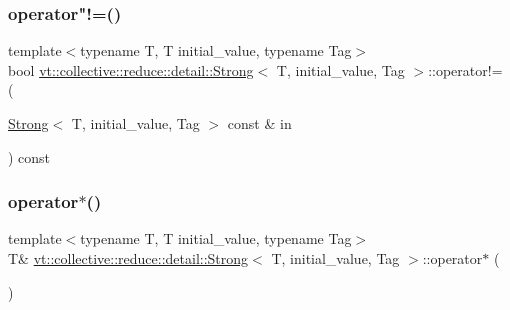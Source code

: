 \mbox{\label{structvt_1_1collective_1_1reduce_1_1detail_1_1_strong_a82bf11914af5ac09c78eb102fb04607a}} 
\subsubsection{\texorpdfstring{operator"!=()}{operator!=()}}
{\footnotesize\ttfamily template$<$typename T, T initial\+\_\+value, typename Tag$>$ \\
bool \hyperlink{structvt_1_1collective_1_1reduce_1_1detail_1_1_strong}{vt\+::collective\+::reduce\+::detail\+::\+Strong}$<$ T, initial\+\_\+value, Tag $>$\+::operator!= (\begin{DoxyParamCaption}\item[{\hyperlink{structvt_1_1collective_1_1reduce_1_1detail_1_1_strong}{Strong}$<$ T, initial\+\_\+value, Tag $>$ const \&}]{in }\end{DoxyParamCaption}) const\hspace{0.3cm}{\ttfamily [inline]}}

\mbox{\label{structvt_1_1collective_1_1reduce_1_1detail_1_1_strong_ae4f668ef8de598177396f4dc575fce3c}} 
\subsubsection{\texorpdfstring{operator$\ast$()}{operator*()}\hspace{0.1cm}{\footnotesize\ttfamily [1/2]}}
{\footnotesize\ttfamily template$<$typename T, T initial\+\_\+value, typename Tag$>$ \\
T\& \hyperlink{structvt_1_1collective_1_1reduce_1_1detail_1_1_strong}{vt\+::collective\+::reduce\+::detail\+::\+Strong}$<$ T, initial\+\_\+value, Tag $>$\+::operator$\ast$ (\begin{DoxyParamCaption}{ }\end{DoxyParamCaption})\hspace{0.3cm}{\ttfamily [inline]}}

